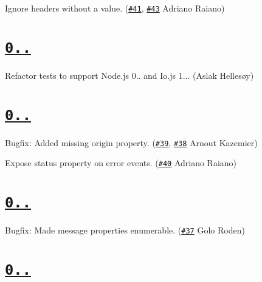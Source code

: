 
\begin{DoxyItemize}
\item Ignore headers without a value. (\href{https://github.com/aslakhellesoy/eventsource-node/issues/41}{\tt \#41}, \href{https://github.com/aslakhellesoy/eventsource-node/pull/43}{\tt \#43} Adriano Raiano)
\end{DoxyItemize}

\section*{\href{https://github.com/aslakhellesoy/eventsource-node/compare/v0.1.4...v0.1.5}{\tt 0..}}


\begin{DoxyItemize}
\item Refactor tests to support Node.\+js 0.. and Io.\+js 1... (Aslak Hellesøy)
\end{DoxyItemize}

\section*{\href{https://github.com/aslakhellesoy/eventsource-node/compare/v0.1.3...master}{\tt 0..}}


\begin{DoxyItemize}
\item Bugfix\+: Added missing origin property. (\href{https://github.com/aslakhellesoy/eventsource-node/pull/39}{\tt \#39}, \href{https://github.com/aslakhellesoy/eventsource-node/issues/38}{\tt \#38} Arnout Kazemier)
\item Expose {\ttfamily status} property on {\ttfamily error} events. (\href{https://github.com/aslakhellesoy/eventsource-node/pull/40}{\tt \#40} Adriano Raiano)
\end{DoxyItemize}

\section*{\href{https://github.com/aslakhellesoy/eventsource-node/compare/v0.1.2...v0.1.3}{\tt 0..}}


\begin{DoxyItemize}
\item Bugfix\+: Made message properties enumerable. (\href{https://github.com/aslakhellesoy/eventsource-node/pull/37}{\tt \#37} Golo Roden)
\end{DoxyItemize}

\section*{\href{https://github.com/aslakhellesoy/eventsource-node/compare/v0.1.1...v0.1.2}{\tt 0..}}


